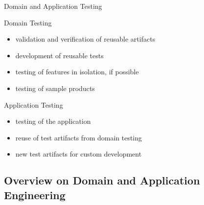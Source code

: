 \begin{frame}{Domain and Application Testing}
	\begin{fancycolumns}[T,columns=3,widths={10}]
		\renewcommand{\projectcartoonwidth}{1}
	\nextcolumn
		\begin{definition}{Domain Testing} %
			\begin{itemize}
				\item validation and verification of reusable artifacts
				\item development of reusable tests
				\item testing of features in isolation, if possible
				\item testing of sample products\\
			\end{itemize}
		\end{definition}
	\nextcolumn
		\begin{definition}{Application Testing}
			\begin{itemize}
				\item testing of the application
				\item reuse of test artifacts from domain testing
				\item new test artifacts for custom development
			\end{itemize}
		\end{definition}
	\end{fancycolumns}
\end{frame}

\subsection{Overview on Domain and Application Engineering}

